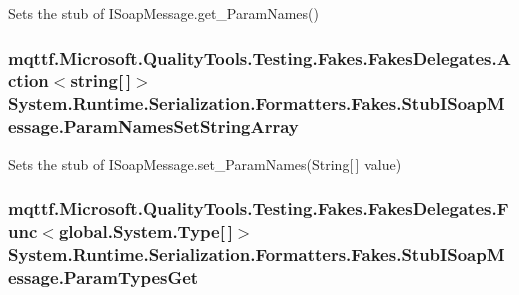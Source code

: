Sets the stub of I\-Soap\-Message.\-get\-\_\-\-Param\-Names()

\hypertarget{class_system_1_1_runtime_1_1_serialization_1_1_formatters_1_1_fakes_1_1_stub_i_soap_message_aa838382ce6f2c59a1511107bdd8188e2}{
\subsubsection[{Param\-Names\-Set\-String\-Array}]{\setlength{\rightskip}{0pt plus 5cm}mqttf.\-Microsoft.\-Quality\-Tools.\-Testing.\-Fakes.\-Fakes\-Delegates.\-Action$<$string\mbox{[}$\,$\mbox{]}$>$ System.\-Runtime.\-Serialization.\-Formatters.\-Fakes.\-Stub\-I\-Soap\-Message.\-Param\-Names\-Set\-String\-Array}}\label{class_system_1_1_runtime_1_1_serialization_1_1_formatters_1_1_fakes_1_1_stub_i_soap_message_aa838382ce6f2c59a1511107bdd8188e2}


Sets the stub of I\-Soap\-Message.\-set\-\_\-\-Param\-Names(\-String\mbox{[}$\,$\mbox{]} value)

\hypertarget{class_system_1_1_runtime_1_1_serialization_1_1_formatters_1_1_fakes_1_1_stub_i_soap_message_a5c1ac45397be11ad69fb77281e6d8c97}{
\subsubsection[{Param\-Types\-Get}]{\setlength{\rightskip}{0pt plus 5cm}mqttf.\-Microsoft.\-Quality\-Tools.\-Testing.\-Fakes.\-Fakes\-Delegates.\-Func$<$global.\-System.\-Type\mbox{[}$\,$\mbox{]}$>$ System.\-Runtime.\-Serialization.\-Formatters.\-Fakes.\-Stub\-I\-Soap\-Message.\-Param\-Types\-Get}}\label{class_system_1_1_runtime_1_1_serialization_1_1_formatters_1_1_fakes_1_1_stub_i_soap_message_a5c1ac45397be11ad69fb77281e6d8c97}


